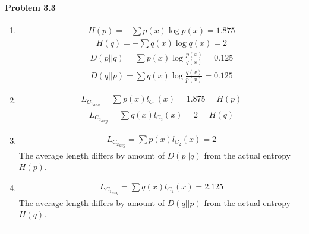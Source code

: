\documentclass[12pt, letterpaper]{scrartcl}
\begin{document}
\paragraph*{Problem 3.3} \hfill\newline
\begin{enumerate}[((a))]
    \item
    \begin{align*}
        H(p)=-\sum p(x)\log p(x)=1.875
    \end{align*}
    \begin{align*}
        H(q)=-\sum q(x)\log q(x)=2
    \end{align*}
    \begin{align*}
        D(p||q)=\sum p(x)\log \frac{p(x)}{q(x)}=0.125
    \end{align*}
    \begin{align*}
        D(q||p)=\sum q(x)\log \frac{q(x)}{p(x)}=0.125
    \end{align*}
    \item
    \begin{align*}
        L_{{C_1}_{avg}}=\sum p(x)l_{C_1}(x)=1.875=H(p)
    \end{align*}
    \begin{align*}
        L_{{C_2}_{avg}}=\sum q(x)l_{C_2}(x)=2=H(q)
    \end{align*}
    \item
    \begin{align*}
        L_{{C_2}_{avg}}=\sum p(x)l_{C_2}(x)=2
    \end{align*}
    The average length differs by amount of $D(p||q)$ from the actual entropy $H(p)$.
    \item 
    \begin{align*}
        L_{{C_1}_{avg}}=\sum q(x)l_{C_1}(x)=2.125
    \end{align*}
    The average length differs by amount of $D(q||p)$ from the actual entropy $H(q)$.
\end{enumerate}
\hrule
\end{document}
